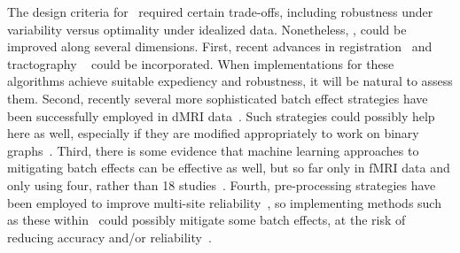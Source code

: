 \documentclass[11pt]{article}
\begin{document}
%
The design criteria for \ndmg~required certain trade-offs, including robustness under variability versus optimality under idealized data.  
Nonetheless, \ndmg, could be improved along several dimensions.
First, 
recent advances in registration~\cite{lddmm} and tractography ~\cite{probtrackx} could be incorporated.
When implementations for these algorithms achieve suitable expediency and robustness, it will be natural to assess them. 
Second, recently several more sophisticated batch effect strategies have been successfully employed in dMRI data~\cite{Fortin2017-dm}. Such strategies could possibly help here as well, especially if they are modified appropriately to work on binary graphs~\cite{Leek2007}.
%
Third, there is some evidence that machine learning approaches to mitigating batch effects can be effective as well, but so far only in fMRI data and only using four, rather than 18 studies~\cite{abraham2017deriving}.
Fourth, pre-processing strategies have been employed to improve multi-site reliability~\cite{mirzaalian2017harmonization}, so implementing methods such as these within \ndmg~could possibly mitigate some batch effects, at the risk of reducing accuracy and/or reliability~\cite{adhd}.
\end{document}
